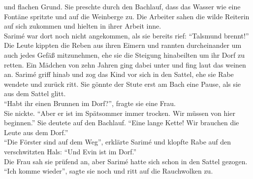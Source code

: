 und flachen Grund. Sie preschte durch den Bachlauf, dass das Wasser wie eine Fontäne spritzte und 
auf die Weinberge zu. Die Arbeiter sahen die wilde Reiterin auf sich zukommen und hielten in ihrer 
Arbeit inne.\\
Sarimé war dort noch nicht angekommen, als sie bereits rief: ``Talsmund brennt!''\\
Die Leute kippten die Reben aus ihren Eimern und rannten durcheinander um auch jedes Gefäß 
mitzunehmen, ehe sie die Steigung hinabeilten um ihr Dorf zu retten. Ein Mädchen von zehn Jahren 
ging dabei unter und fing laut das weinen an. Sarimé griff hinab und zog das Kind vor sich in den 
Sattel, ehe sie Rabe wendete und zurück ritt. Sie gönnte der Stute erst am Bach eine Pause, als sie 
aus dem Sattel glitt.\\
``Habt ihr einen Brunnen im Dorf?'', fragte sie eine Frau.\\
Sie nickte. ``Aber er ist im Spätsommer immer trocken. Wir müssen von hier beginnen.'' Sie deutete 
auf den Bachlauf. ``Eine lange Kette! Wir brauchen die Leute aus dem Dorf.''\\
``Die Förster sind auf dem Weg'', erklärte Sarimé und klopfte Rabe auf den verschwitzten Hals: 
``Und Evin ist im Dorf.''\\
Die Frau sah sie prüfend an, aber Sarimé hatte sich schon in den Sattel gezogen. ``Ich komme 
wieder'', sagte sie noch und ritt auf die Rauchwolken zu.\\

